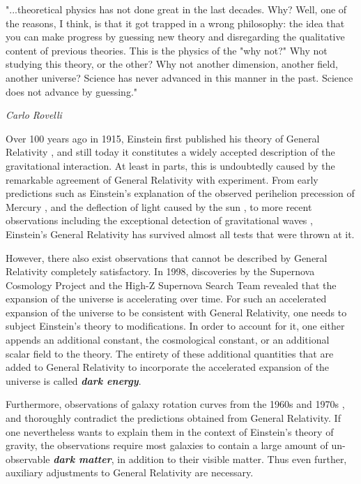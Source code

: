 \setlength{\epigraphwidth}{0.6\textwidth}
\epigraph{"...theoretical physics has not done great in the last decades. Why? Well, one of the reasons, I think, is that it got trapped in a wrong philosophy: the idea that you can make progress by guessing new theory and disregarding the qualitative content of previous theories. This is the physics of the "why not?" Why not studying this theory, or the other? Why not another dimension, another field, another universe? Science has never advanced in this manner in the past. Science does not advance by guessing."}{\textit{Carlo Rovelli}}

Over 100 years ago in 1915, Einstein first published his theory of General Relativity \cite{1915SPAW.......844E}, and still today it constitutes a widely accepted description of the gravitational interaction. 
At least in parts, this is undoubtedly caused by the remarkable agreement of General Relativity with experiment. 
From early predictions such as Einstein's explanation of the observed perihelion precession of Mercury \cite{Einst2}, and the deflection of light caused by the sun \cite{Will2006}, to more recent observations including the exceptional detection of gravitational waves \cite{2016PhRvL.116f1102A}, Einstein's General Relativity has survived almost all tests that were thrown at it.

However, there also exist observations that cannot be described by General Relativity completely satisfactory. In 1998, discoveries by the Supernova Cosmology Project \cite{1999ApJ...517..565P} and the High-Z Supernova Search Team \cite{1998AJ....116.1009R} revealed that the expansion of the universe is accelerating over time. For such an accelerated expansion of the universe to be consistent with General Relativity, one needs to subject Einstein's theory to modifications. In order to account for it, one either appends an additional constant, the cosmological constant, or an additional scalar field to the theory. The entirety of these additional quantities that are added to General Relativity to incorporate the accelerated expansion of the universe is called \textit{\textbf{dark energy}}.

Furthermore, observations of galaxy rotation curves from the 1960s and 1970s \cite{1970ApJ...160..811F}, \cite{1970ApJ...159..379R} and \cite{1980ApJ...238..471R} thoroughly contradict the predictions obtained from General Relativity. If one nevertheless wants to explain them in the context of Einstein's theory of gravity, the observations require most galaxies to contain a large amount of un-observable \textit{\textbf{dark matter}}, in addition to their visible matter. Thus even further, auxiliary adjustments to General Relativity are necessary. 

